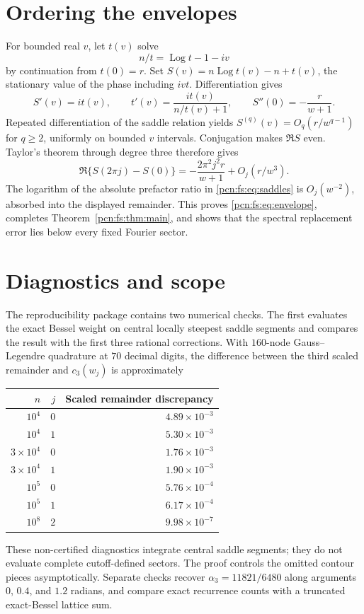 \documentclass[11pt,letterpaper]{article}
\theoremstyle{remark}\newtheorem{remark}[theorem]{Remark}
\newcommand{\Log}{\operatorname{Log}}
\begin{document}
\section{Ordering the envelopes}
For bounded real $v$, let $t(v)$ solve
\[
 n/t=\Log t-1-iv
\]
by continuation from $t(0)=r$. Set $S(v)=n\Log t(v)-n+t(v)$, the stationary value of the phase including $ivt$. Differentiation gives
\[
 S'(v)=it(v),\qquad
 t'(v)=\frac{it(v)}{n/t(v)+1},\qquad
 S''(0)=-\frac r{w+1}.
\]
Repeated differentiation of the saddle relation yields
$S^{(q)}(v)=O_q(r/w^{q-1})$ for $q\ge2$, uniformly on bounded $v$ intervals. Conjugation makes $\Re S$ even. Taylor's theorem through degree three therefore gives
\[
 \Re\{S(2\pi j)-S(0)\}
       =-\frac{2\pi^2j^2r}{w+1}+O_j(r/w^3).
\]
The logarithm of the absolute prefactor ratio in \eqref{pcn:fs:eq:saddles} is $O_j(w^{-2})$, absorbed into the displayed remainder. This proves \eqref{pcn:fs:eq:envelope}, completes Theorem~\ref{pcn:fs:thm:main}, and shows that the spectral replacement error lies below every fixed Fourier sector.

\section{Diagnostics and scope}\label{pcn:fs:sec:scope}
The reproducibility package contains two numerical checks. The first evaluates the exact Bessel weight on central locally steepest saddle segments and compares the result with the first three rational corrections. With $160$-node Gauss--Legendre quadrature at $70$ decimal digits, the difference between the third scaled remainder and $c_3(w_j)$ is approximately
\begin{center}
\begin{tabular}{rrr}
\toprule
$n$ & $j$ & Scaled remainder discrepancy\\
\midrule
$10^4$ & $0$ & $4.89\times10^{-3}$\\
$10^4$ & $1$ & $5.30\times10^{-3}$\\
$3\times10^4$ & $0$ & $1.76\times10^{-3}$\\
$3\times10^4$ & $1$ & $1.90\times10^{-3}$\\
$10^5$ & $0$ & $5.76\times10^{-4}$\\
$10^5$ & $1$ & $6.17\times10^{-4}$\\
$10^8$ & $2$ & $9.98\times10^{-7}$\\
\bottomrule
\end{tabular}
\end{center}
These non-certified diagnostics integrate central saddle segments; they do not evaluate complete cutoff-defined sectors. The proof controls the omitted contour pieces asymptotically. Separate checks recover $\alpha_3=11821/6480$ along arguments $0$, $0.4$, and $1.2$ radians, and compare exact recurrence counts with a truncated exact-Bessel lattice sum.
\end{document}
